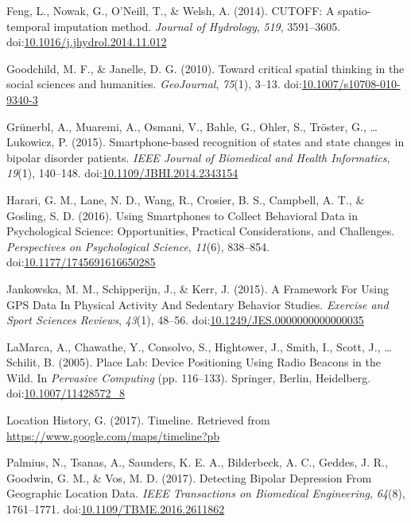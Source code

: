 \documentclass[english,man]{apa6}
\theoremstyle{definition}
\theoremstyle{definition}
\theoremstyle{definition}
\theoremstyle{remark}
\begin{document}
\hypertarget{ref-feng_cutoff:_2014}{}
Feng, L., Nowak, G., O'Neill, T., \& Welsh, A. (2014). CUTOFF: A
spatio-temporal imputation method. \emph{Journal of Hydrology},
\emph{519}, 3591--3605.
doi:\href{https://doi.org/10.1016/j.jhydrol.2014.11.012}{10.1016/j.jhydrol.2014.11.012}

\hypertarget{ref-goodchild_toward_2010}{}
Goodchild, M. F., \& Janelle, D. G. (2010). Toward critical spatial
thinking in the social sciences and humanities. \emph{GeoJournal},
\emph{75}(1), 3--13.
doi:\href{https://doi.org/10.1007/s10708-010-9340-3}{10.1007/s10708-010-9340-3}

\hypertarget{ref-grunerbl_smartphone-based_2015}{}
Grünerbl, A., Muaremi, A., Osmani, V., Bahle, G., Ohler, S., Tröster,
G., \ldots{} Lukowicz, P. (2015). Smartphone-based recognition of states
and state changes in bipolar disorder patients. \emph{IEEE Journal of
Biomedical and Health Informatics}, \emph{19}(1), 140--148.
doi:\href{https://doi.org/10.1109/JBHI.2014.2343154}{10.1109/JBHI.2014.2343154}

\hypertarget{ref-harari_using_2016}{}
Harari, G. M., Lane, N. D., Wang, R., Crosier, B. S., Campbell, A. T.,
\& Gosling, S. D. (2016). Using Smartphones to Collect Behavioral Data
in Psychological Science: Opportunities, Practical Considerations, and
Challenges. \emph{Perspectives on Psychological Science}, \emph{11}(6),
838--854.
doi:\href{https://doi.org/10.1177/1745691616650285}{10.1177/1745691616650285}

\hypertarget{ref-jankowska_framework_2015}{}
Jankowska, M. M., Schipperijn, J., \& Kerr, J. (2015). A Framework For
Using GPS Data In Physical Activity And Sedentary Behavior Studies.
\emph{Exercise and Sport Sciences Reviews}, \emph{43}(1), 48--56.
doi:\href{https://doi.org/10.1249/JES.0000000000000035}{10.1249/JES.0000000000000035}

\hypertarget{ref-lamarca_place_2005}{}
LaMarca, A., Chawathe, Y., Consolvo, S., Hightower, J., Smith, I.,
Scott, J., \ldots{} Schilit, B. (2005). Place Lab: Device Positioning
Using Radio Beacons in the Wild. In \emph{Pervasive Computing} (pp.
116--133). Springer, Berlin, Heidelberg.
doi:\href{https://doi.org/10.1007/11428572_8}{10.1007/11428572\_8}

\hypertarget{ref-location_history_timeline_2017}{}
Location History, G. (2017). Timeline. Retrieved from
\url{https://www.google.com/maps/timeline?pb}

\hypertarget{ref-palmius_detecting_2017}{}
Palmius, N., Tsanas, A., Saunders, K. E. A., Bilderbeck, A. C., Geddes,
J. R., Goodwin, G. M., \& Vos, M. D. (2017). Detecting Bipolar
Depression From Geographic Location Data. \emph{IEEE Transactions on
Biomedical Engineering}, \emph{64}(8), 1761--1771.
doi:\href{https://doi.org/10.1109/TBME.2016.2611862}{10.1109/TBME.2016.2611862}
\end{document}
